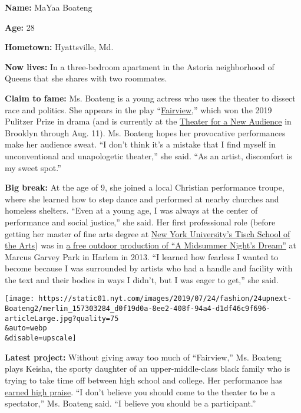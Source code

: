 \textbf{Name:} MaYaa Boateng

\textbf{Age:} 28

\textbf{Hometown:} Hyattsville, Md.

\textbf{Now lives:} In a three-bedroom apartment in the Astoria
neighborhood of Queens that she shares with two roommates.

\textbf{Claim to fame:} Ms. Boateng is a young actress who uses the
theater to dissect race and politics. She appears in the play
``\href{https://www.nytimes.com/2018/06/17/theater/review-theater-as-sabotage-in-the-dazzling-fairview.html?module=inline}{Fairview},''
which won the 2019 Pulitzer Prize in drama (and is currently at the
\href{https://www.tfana.org/}{Theater for a New Audience} in Brooklyn
through Aug. 11). Ms. Boateng hopes her provocative performances make
her audience sweat. ``I don't think it's a mistake that I find myself in
unconventional and unapologetic theater,'' she said. ``As an artist,
discomfort is my sweet spot.''

\textbf{Big break:} At the age of 9, she joined a local Christian
performance troupe, where she learned how to step dance and performed at
nearby churches and homeless shelters. ``Even at a young age, I was
always at the center of performance and social justice,'' she said. Her
first professional role (before getting her master of fine arts degree
at \href{https://tisch.nyu.edu/grad-acting}{New York University's Tisch
School of the Arts}) was in
\href{https://www.nytimes.com/2013/07/17/theater/reviews/a-midsummer-nights-dream-gets-a-harlem-spin.html}{a
free outdoor production of ``A Midsummer Night's Dream''} at Marcus
Garvey Park in Harlem in 2013. ``I learned how fearless I wanted to
become because I was surrounded by artists who had a handle and facility
with the text and their bodies in ways I didn't, but I was eager to
get,'' she said.

\texttt{[image: https://static01.nyt.com/images/2019/07/24/fashion/24upnext-Boateng2/merlin\_157303284\_d0f19d0a-8ee2-408f-94a4-d1df46c9f696-articleLarge.jpg?quality=75\\\&auto=webp\\\&disable=upscale]}

\textbf{Latest project:} Without giving away too much of ``Fairview,''
Ms. Boateng plays Keisha, the sporty daughter of an upper-middle-class
black family who is trying to take time off between high school and
college. Her performance has
\href{https://www.nytimes.com/2018/06/17/theater/review-theater-as-sabotage-in-the-dazzling-fairview.html}{earned
high praise}. ``I don't believe you should come to the theater to be a
spectator,'' Ms. Boateng said. ``I believe you should be a
participant.''

